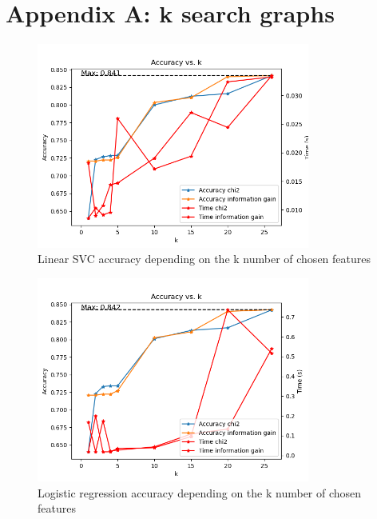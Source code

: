 \documentclass{article}
\begin{document}
    
    

    \appendix


    \section{Appendix A: k search graphs}\label{sec:appendixA}

    \begin{figure}[H]
        \centering
        \includegraphics[width=0.8\textwidth]{report_img/k_search/linear_svc}
        \caption{Linear SVC accuracy depending on the k number of chosen features}
        \label{fig:}
    \end{figure}

    \begin{figure}[H]
        \centering
        \includegraphics[width=0.8\textwidth]{report_img/k_search/logistic_regression}
        \caption{Logistic regression accuracy depending on the k number of chosen features}
        \label{fig:}
    \end{figure}
\end{document}
